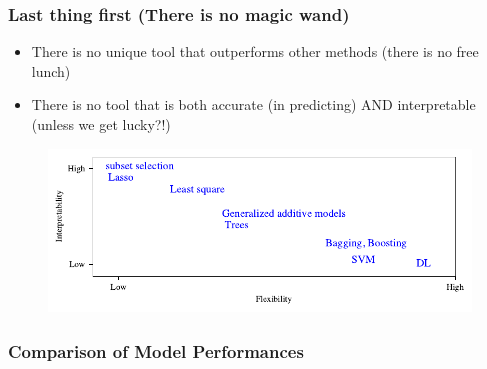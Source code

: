 \documentclass[serif, xcolor={dvipsnames}]{beamer} %
\begin{document}
\begin{frame}[t]
\frametitle{Last thing first (There is no magic wand)}

\begin{itemize}
\item There is no unique tool that outperforms other methods (there is no free lunch) 
\pause
\item There is no tool that is both accurate (in predicting) AND interpretable (unless we get lucky?!)
\end{itemize}
\pause

\begin{figure}[htbp]
\centering
\includegraphics[width=\linewidth]{model_flex_inter}
\end{figure}
\end{frame}
\begin{frame}
\frametitle{Comparison of Model Performances}
\vspace{-.1in}
\begin{figure}[!ht] %
\captionsetup[subfigure]{labelformat=empty}
\centering
\hspace{-.12in}
\\
\vspace{-.35in}
\end{figure}
\end{frame}
\end{document}
